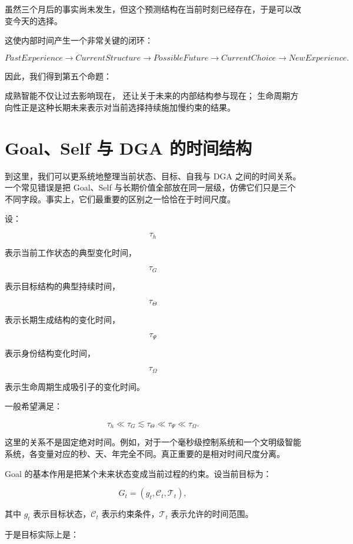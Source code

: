 虽然三个月后的事实尚未发生，但这个预测结构在当前时刻已经存在，于是可以改变今天的选择。

这使内部时间产生一个非常关键的闭环：

\[
PastExperience
\rightarrow
CurrentStructure
\rightarrow
PossibleFuture
\rightarrow
CurrentChoice
\rightarrow
NewExperience.
\]

因此，我们得到第五个命题：

\begin{proposition*}
成熟智能不仅让过去影响现在，
还让关于未来的内部结构参与现在；
生命周期方向性正是这种长期未来表示对当前选择持续施加慢约束的结果。
\end{proposition*}

\section{Goal、Self 与 DGA 的时间结构}

到这里，我们可以更系统地整理当前状态、目标、自我与 DGA 之间的时间关系。一个常见错误是把 Goal、Self 与长期价值全部放在同一层级，仿佛它们只是三个不同字段。事实上，它们最重要的区别之一恰恰在于时间尺度。

设：

\[
\tau_h
\]

表示当前工作状态的典型变化时间，

\[
\tau_G
\]

表示目标结构的典型持续时间，

\[
\tau_\Theta
\]

表示长期生成结构的变化时间，

\[
\tau_\Psi
\]

表示身份结构变化时间，

\[
\tau_\Omega
\]

表示生命周期生成吸引子的变化时间。

一般希望满足：

\[
\boxed{
\tau_h
\ll
\tau_G
\lesssim
\tau_\Theta
\ll
\tau_\Psi
\ll
\tau_\Omega.
}
\]

这里的关系不是固定绝对时间。例如，对于一个毫秒级控制系统和一个文明级智能系统，各变量对应的秒、天、年完全不同。真正重要的是相对时间尺度分离。

Goal 的基本作用是把某个未来状态变成当前过程的约束。设当前目标为：

\[
G_t
=
(g_t,\mathcal{C}_t,\mathcal{T}_t),
\]

其中 $g_t$ 表示目标状态，$\mathcal{C}_t$ 表示约束条件，$\mathcal{T}_t$ 表示允许的时间范围。

于是目标实际上是：


